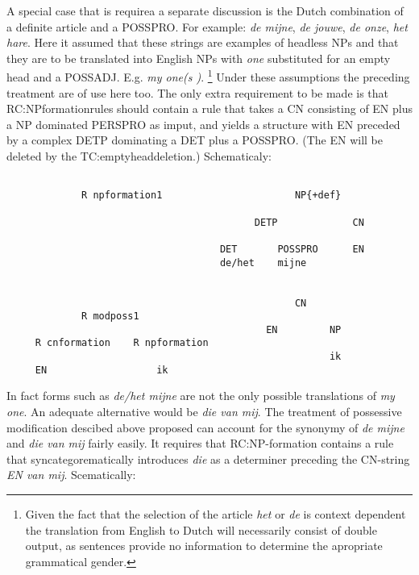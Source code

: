 A special case that is requirea a separate discussion is the Dutch combination
of a definite article and a POSSPRO. For example: {\em de mijne}, {\em de
jouwe}, {\em de onze}, {\em het hare}. Here it assumed that these strings are
examples of headless NPs and that they are to be translated into English NPs
with {\em one} substituted for an empty head and a POSSADJ.  E.g. {\em my one(s
)}. 
\footnote{Given the fact that the selection of the article {\em het} or {\em 
de} is context dependent the translation from English to Dutch will 
necessarily consist of double output, as sentences provide no information
to determine the apropriate grammatical gender. }
Under these assumptions the preceding treatment are of use here too. The
only extra requirement to be made is that RC:NPformationrules should contain a
rule that takes  a CN consisting of EN plus a NP dominated PERSPRO as imput,
and yields a structure with EN preceded by a complex DETP dominating a DET plus
a POSSPRO. (The EN will be deleted by the TC:emptyheaddeletion.) Schematicaly:
\begin{verbatim}

             R npformation1                       NP{+def}
                                                 
                                           DETP             CN

                                     DET       POSSPRO      EN
                                     de/het    mijne     

                                           
                                                  CN
             R modposs1
                                             EN         NP     
     R cnformation    R npformation
                                                        ik
     EN                   ik

\end{verbatim}
In fact forms such as {\em de/het mijne} are not the only possible translations
of {\em my one}. An adequate alternative would be {\em die van mij}. 
The treatment of possessive modification descibed above proposed can account
for the synonymy of {\em de mijne} and {\em die van mij} fairly easily.
It requires that RC:NP-formation contains a rule that syncategorematically
introduces {\em die} as a determiner preceding the CN-string {\em EN van mij}.
Scematically:
